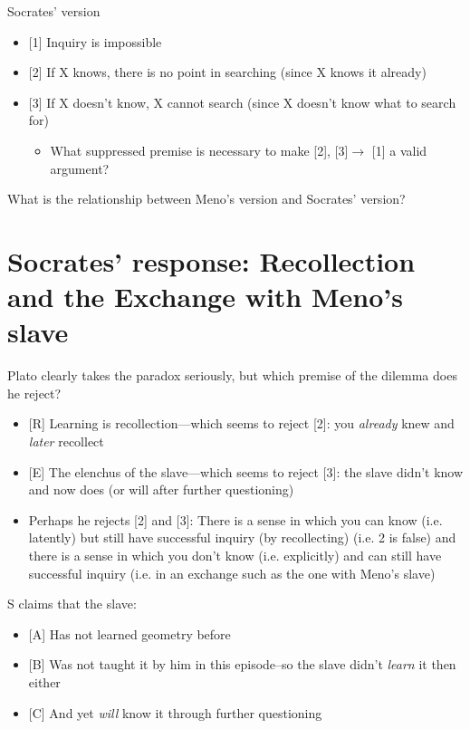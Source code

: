 \documentclass[10 pt]{article}
\begin{document}
\noindent Socrates' version
\begin{itemize}\item{[1] Inquiry is impossible}\item{[2] If X knows, there is no point in searching (since X knows it already)}\item{[3] If X doesn't know, X cannot search (since X doesn't know what to search for)}\begin{itemize}\item{What suppressed premise is necessary to make [2], [3]$\rightarrow$ [1] a valid argument?}\end{itemize}\end{itemize}

\noindent What is the relationship between Meno's version and Socrates' version?

\section*{Socrates' response: Recollection and the Exchange with Meno's slave}

\noindent Plato clearly takes the paradox seriously, but which premise of the dilemma does he reject?
\vspace*{2mm}

\begin{itemize}\item{[R] Learning is recollection---which seems to reject [2]: you \emph{already} knew and \emph{later} recollect}\item{[E] The elenchus of the slave---which seems to reject [3]: the slave didn't know and now does (or will after further questioning)}\item{Perhaps he rejects [2] and [3]: There is a sense in which you can know (i.e. latently) but still have successful inquiry (by recollecting) (i.e. 2 is false) and there is a sense in which you don't know (i.e. explicitly) and can still have successful inquiry (i.e. in an exchange such as the one with Meno's slave)}\end{itemize}

\noindent S claims that the slave:
\begin{itemize}\item{[A] Has not learned geometry before}\item{[B] Was not taught it by him in this episode--so the slave didn't \emph{learn} it then either}\item{[C] And yet \emph{will} know it through further questioning}\end{itemize}
\end{document}
